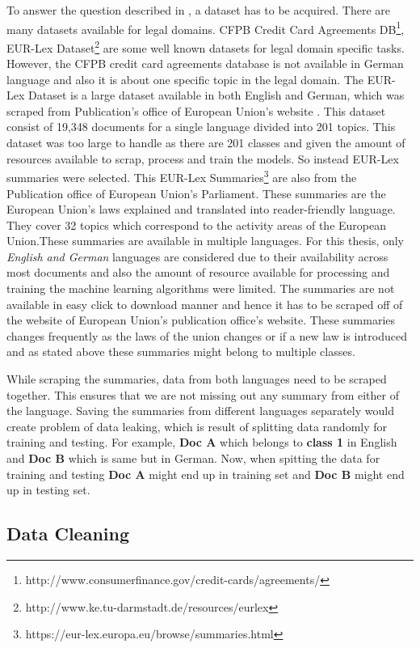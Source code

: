 To answer the question described in , a dataset has to be acquired. There are many datasets available for legal domains. CFPB Credit Card Agreements DB\footnote{http://www.consumerfinance.gov/credit-cards/agreements/}, EUR-Lex Dataset\footnote{http://www.ke.tu-darmstadt.de/resources/eurlex} are some well known datasets for legal domain specific tasks. However, the CFPB credit card agreements database is not available in German language and also it is about one specific topic in the legal domain. The EUR-Lex Dataset is a large dataset available in both English and German, which was scraped from Publication's office of European Union's website \cite{mencia2010efficient}. This dataset consist of 19,348 documents for a single language divided into 201 topics. This dataset was too large to handle as there are 201 classes and given the amount of resources available to scrap, process and train the models. So instead EUR-Lex summaries were selected. This EUR-Lex Summaries\footnote{https://eur-lex.europa.eu/browse/summaries.html} are also from the Publication office of European Union's Parliament. These summaries are the European Union's laws explained and translated into reader-friendly language. They cover 32 topics which correspond to the activity areas of the European Union.These summaries are available in multiple languages. For this thesis, only \textit{English and German} languages are considered due to their availability across most documents and also the amount of resource available for processing and training the machine learning algorithms were limited. The summaries are not available in easy click to download manner and hence it has to be scraped off of the website of European Union's publication office's website. These summaries changes frequently as the laws of the union changes or if a new law is introduced and as stated above these summaries might belong to multiple classes. 

While scraping the summaries, data from both languages need to be scraped together. This ensures that we are not missing out any summary from either of the language. Saving the summaries from different languages separately would create problem of data leaking, which is result of splitting data randomly for training and testing. For example, \textbf{Doc A} which belongs to \textbf{class 1} in English and \textbf{Doc B} which is same but in German. Now, when spitting the data for training and testing \textbf{Doc A} might end up in training set and \textbf{Doc B} might end up in testing set. 

\subsection*{Data Cleaning}\label{ConceptCleaning}

